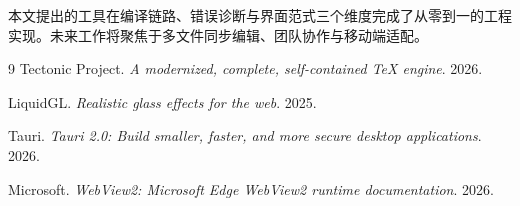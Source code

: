 \documentclass[11pt]{ctexart}
\begin{document}
本文提出的工具在编译链路、错误诊断与界面范式三个维度完成了从零到一的工程实现。未来工作将聚焦于多文件同步编辑、团队协作与移动端适配。

\begin{thebibliography}{9}
 Tectonic Project. \emph{A modernized, complete, self-contained TeX engine}. 2026.

 LiquidGL. \emph{Realistic glass effects for the web}. 2025.

 Tauri. \emph{Tauri 2.0: Build smaller, faster, and more secure desktop applications}. 2026.

 Microsoft. \emph{WebView2: Microsoft Edge WebView2 runtime documentation}. 2026.
\end{thebibliography}
\end{document}
